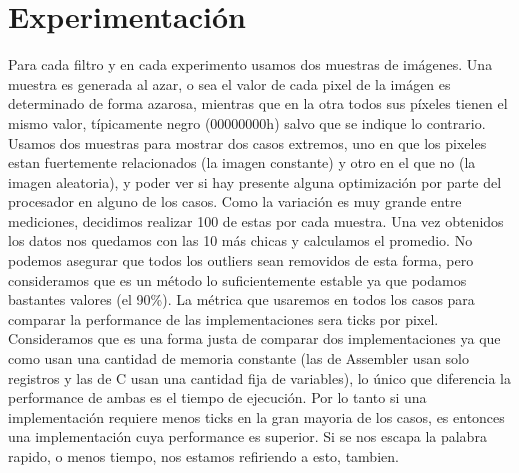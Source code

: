 


\section{Experimentación}
\hfill \break
Para cada filtro y en cada experimento usamos dos muestras de imágenes. Una muestra es generada al azar, o sea el valor de cada pixel de la imágen es determinado de forma azarosa, mientras que en la otra todos sus píxeles tienen el mismo valor, típicamente negro (00000000h) salvo que se indique lo contrario. Usamos dos muestras para mostrar dos casos extremos, uno en que los pixeles estan fuertemente relacionados (la imagen constante) y otro en el que no (la imagen aleatoria), y poder ver si hay presente alguna optimización por parte del procesador en alguno de los casos. 
\hfill \break
Como la variación es muy grande entre mediciones, decidimos realizar 100 de estas por cada muestra. Una vez obtenidos los datos nos quedamos con las 10 más chicas y calculamos el promedio. No podemos asegurar que todos los outliers sean removidos de esta forma, pero consideramos que es un método lo suficientemente estable ya que podamos bastantes valores (el 90\%). 
\hfill \break
La métrica que usaremos en todos los casos para comparar la performance de las implementaciones sera ticks por pixel. Consideramos que es una forma justa de comparar dos implementaciones ya que como usan una cantidad de memoria constante (las de Assembler usan solo registros y las de C usan una cantidad fija de variables), lo único que diferencia la performance de ambas es el tiempo de ejecución. Por lo tanto si una implementación requiere menos ticks en la gran mayoria de los casos, es entonces una implementación cuya performance es superior. Si se nos escapa la palabra rapido, o menos tiempo, nos estamos refiriendo a esto, tambien. 
\hfill \break
